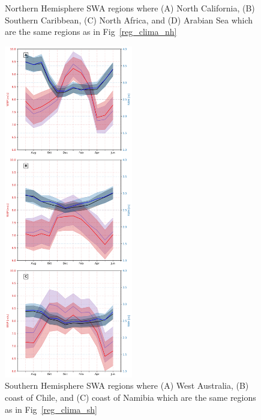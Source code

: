 \documentclass[draft,linenumbers]{agujournal2018}
\begin{document}
\begin{figure}[tbh]
\begin{minipage}{.5\textwidth}
  \caption{Northern Hemisphere SWA regions where (A) North California, (B) Southern Caribbean, (C) North Africa, and (D) Arabian Sea which are the same regions as in Fig~\ref{reg_clima_nh}}
  \label{NH_model_comparison}
\end{minipage}%
\begin{minipage}{.5\textwidth}
  \centering
  \includegraphics[width=0.5\textwidth]{figs/regional_climatologies/SWARs_reg_clima_4x4_sh_ww3.png}
  \caption{Southern Hemisphere SWA regions where (A) West Australia, (B) coast of Chile, and (C) coast of Namibia which are the same regions as in Fig~\ref{reg_clima_sh}}
  \label{SH_model_comparison}
\end{minipage}
\label{ww3_ifremer_ccmp2_compare}
\end{figure}

\end{document}
